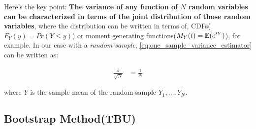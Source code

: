 Here's the key point: \textbf{The variance of any function of $N$ random variables can be characterized in terms of the joint distribution of those random variables}, where the
distribution can be written in terms of, CDFs($F_Y(y) = Pr(Y \leq y)$) or moment generating functions($M_Y(t) = {\mathbb{E}}(e^{tY})$), for example.
In our case with a \textit{random sample}, \ref{eq:one_sample_variance_estimator} can be written as:

\begin{align}
    \frac{\hat{\sigma}}{\sqrt{N}} &= \frac{1}{N} \label{eq:one_sample_variance_estimator_2}
\end{align}

where $\overline{Y}$ is the sample mean of the random sample $Y_1, \ldots, Y_N$.


\subsection{Bootstrap Method(TBU)}

